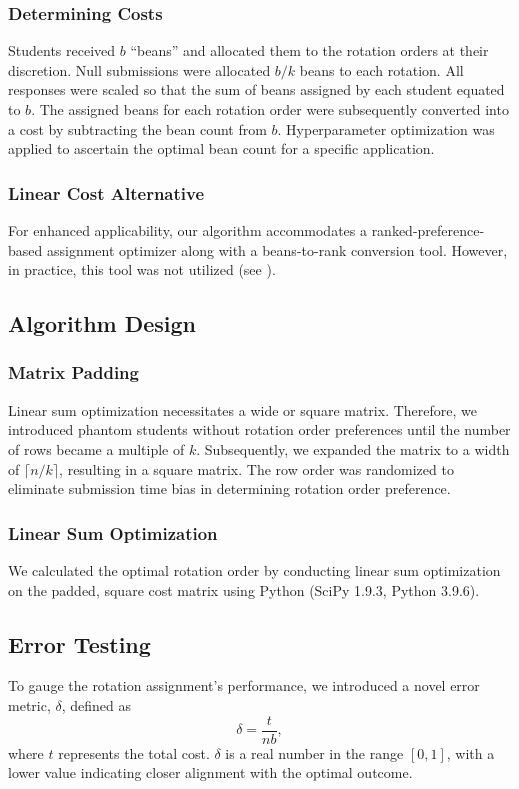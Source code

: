 \documentclass{article}
\begin{document}
\subsubsection{Determining Costs}
\label{subsec:costs}
Students received $b$ ``beans'' and allocated them to the rotation orders at their discretion. Null submissions were allocated $b/k$ beans to each rotation. All responses were scaled so that the sum of beans assigned by each student equated to $b$. The assigned beans for each rotation order were subsequently converted into a cost by subtracting the bean count from $b$. Hyperparameter optimization was applied to ascertain the optimal bean count for a specific application.

\subsubsection{Linear Cost Alternative}
For enhanced applicability, our algorithm accommodates a ranked-preference-based assignment optimizer along with a beans-to-rank conversion tool. However, in practice, this tool was not utilized (see ).

\subsection{Algorithm Design}
\subsubsection{Matrix Padding}
Linear sum optimization necessitates a wide or square matrix. Therefore, we introduced phantom students without rotation order preferences until the number of rows became a multiple of $k$. Subsequently, we expanded the matrix to a width of $\lceil n/k \rceil$, resulting in a square matrix. The row order was randomized to eliminate submission time bias in determining rotation order preference.

\subsubsection{Linear Sum Optimization}
We calculated the optimal rotation order by conducting linear sum optimization on the padded, square cost matrix using Python (SciPy 1.9.3, Python 3.9.6).

\subsection{Error Testing}
To gauge the rotation assignment's performance, we introduced a novel error metric, $\delta$, defined as
\begin{equation}
	\delta = \frac{t}{n b},
\end{equation}
where $t$ represents the total cost. $\delta$ is a real number in the range $[0, 1]$, with a lower value indicating closer alignment with the optimal outcome.
\end{document}
